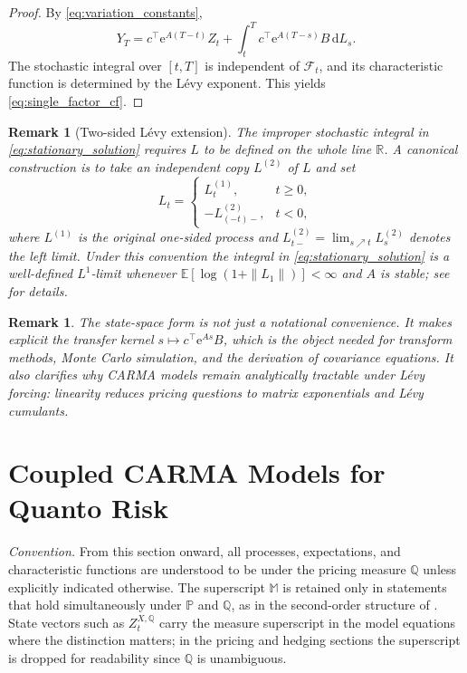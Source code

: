 \documentclass[10pt,a4paper,reqno]{amsart}
\newtheorem{remark}[theorem]{Remark}
\newcommand{\Q}{\mathbb{Q}}
\newcommand{\PP}{\mathbb{P}}
\newcommand{\F}{\mathcal{F}}
\newcommand{\1}{\mathbbm{1}}
\newcommand{\dd}{\mathrm{d}}
\newcommand{\ee}{\mathrm{e}}
\begin{document}
\begin{proof}
By \eqref{eq:variation_constants},
$$
Y_T
= c^\top \ee^{A(T-t)} Z_t
  + \int_t^T c^\top \ee^{A(T-s)} B\,\dd L_s.
$$
The stochastic integral over $[t,T]$ is independent of $\F_t$, and its
characteristic function is determined by the Lévy exponent. This yields
\eqref{eq:single_factor_cf}.
\end{proof}

\begin{remark}[Two-sided Lévy extension]
\label{rem:two_sided_levy}
The improper stochastic integral in \eqref{eq:stationary_solution} requires $L$
to be defined on the whole line $\mathbb{R}$. A canonical construction is to take
an independent copy $L^{(2)}$ of $L$ and set
$$
L_t
= \begin{cases}
    L_t^{(1)}, & t \ge 0,\\
    -L_{(-t)-}^{(2)}, & t < 0,
  \end{cases}
$$
where $L^{(1)}$ is the original one-sided process and $L_{t-}^{(2)} =
\lim_{s\nearrow t}L_s^{(2)}$ denotes the left limit.
Under this convention the integral in \eqref{eq:stationary_solution} is a
well-defined $L^1$-limit whenever $\mathbb{E}[\log(1+\|L_1\|)]<\infty$ and
$A$ is stable; see \citet{Bro01} for details.
\end{remark}

\begin{remark}
The state-space form is not just a notational convenience. It makes explicit the
transfer kernel $s \mapsto c^\top \ee^{As} B$, which is the object needed for
transform methods, Monte Carlo simulation, and the derivation of covariance
equations. It also clarifies why CARMA models remain analytically tractable
under Lévy forcing: linearity reduces pricing questions to matrix exponentials
and Lévy cumulants.
\end{remark}

\section{Coupled CARMA Models for Quanto Risk}\label{sec:coupled-carma-models}

\noindent\textit{Convention.}
From this section onward, all processes, expectations, and characteristic
functions are understood to be under the pricing measure $\Q$ unless
explicitly indicated otherwise.  The superscript $\mathbb{M}$ is retained
only in statements that hold simultaneously under $\PP$ and $\Q$, as in the
second-order structure of .
State vectors such as $Z_t^{X,\Q}$ carry the measure superscript in the
model equations where the distinction matters; in the pricing and hedging
sections the superscript is dropped for readability since $\Q$ is
unambiguous.
\end{document}
